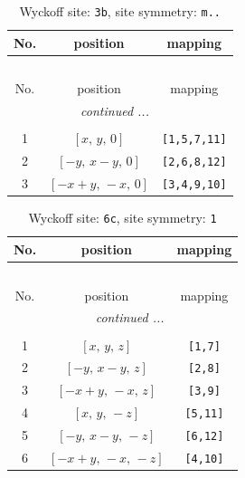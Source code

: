 \documentclass[fleqn,8pt]{jsarticle}
\begin{document}
\begin{longtable}{ccc}
\caption{Wyckoff site: {\tt 3b}, site symmetry: {\tt m..}}
 \\
 \hline \hline
No. & position & mapping \\ \hline \endfirsthead

\multicolumn{2}{l}{\tablename\ \thetable{}} \\
 \hline \hline
No. & position & mapping \\ \hline \endhead

 \hline \hline
\multicolumn{2}{r}{\footnotesize\it continued ...} \\ \endfoot

 \hline \hline
\multicolumn{2}{r}{} \\ \endlastfoot

1 & $\left[ x,\, y,\, 0 \right]$ & {\tt [1,5,7,11]} \\ \hline
2 & $\left[ - y,\, x - y,\, 0 \right]$ & {\tt [2,6,8,12]} \\ \hline
3 & $\left[ - x + y,\, - x,\, 0 \right]$ & {\tt [3,4,9,10]} \\
\end{longtable}
\renewcommand{\arraystretch}{1.2}
\begin{longtable}{ccc}
\caption{Wyckoff site: {\tt 6c}, site symmetry: {\tt 1}}
 \\
 \hline \hline
No. & position & mapping \\ \hline \endfirsthead

\multicolumn{2}{l}{\tablename\ \thetable{}} \\
 \hline \hline
No. & position & mapping \\ \hline \endhead

 \hline \hline
\multicolumn{2}{r}{\footnotesize\it continued ...} \\ \endfoot

 \hline \hline
\multicolumn{2}{r}{} \\ \endlastfoot

1 & $\left[ x,\, y,\, z \right]$ & {\tt [1,7]} \\ \hline
2 & $\left[ - y,\, x - y,\, z \right]$ & {\tt [2,8]} \\ \hline
3 & $\left[ - x + y,\, - x,\, z \right]$ & {\tt [3,9]} \\ \hline
4 & $\left[ x,\, y,\, - z \right]$ & {\tt [5,11]} \\ \hline
5 & $\left[ - y,\, x - y,\, - z \right]$ & {\tt [6,12]} \\ \hline
6 & $\left[ - x + y,\, - x,\, - z \right]$ & {\tt [4,10]} \\
\end{longtable}
\end{document}
